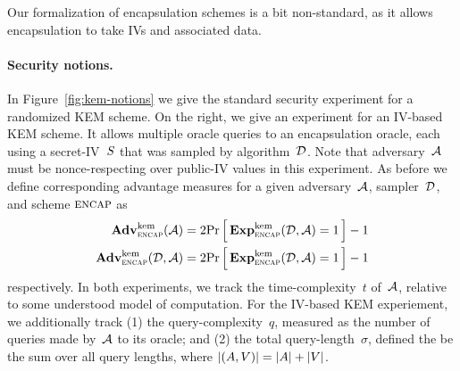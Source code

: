 Our formalization of encapsulation schemes is a bit non-standard, as it allows encapsulation to take IVs and associated data.

\paragraph{Security notions. } In Figure~\ref{fig:kem-notions} we give the standard security experiment for a randomized KEM scheme.  On the right, we give an experiment for an IV-based KEM scheme.  It allows multiple oracle queries to an encapsulation oracle, each using a secret-IV~$S$ that was sampled by algorithm~${\cal D}$.  Note that adversary~${\cal A}$ must be nonce-respecting over public-IV values in this experiment.
As before we define corresponding advantage measures for a given adversary~${\cal A}$, sampler~${\cal D}$, and scheme $\textsc{encap}$ as
\begin{align*}
\mathbf{Adv}^{\mathrm{kem}}_{\textsc{encap}}{({\cal A})}&=2{\Pr\left[\,{\mathbf{Exp}^{\mathrm{kem}}_{\textsc{encap}}{({\cal D},{\cal A})}=1}\,\right]}-1\\ \mathbf{Adv}^{\mathrm{kem}}_{\textsc{encap}}{({\cal D},{\cal A})}&=2{\Pr\left[\,{\mathbf{Exp}^{\mathrm{kem}}_{\textsc{encap}}{({\cal D},{\cal A})}=1}\,\right]}-1
\end{align*}
respectively.  In both experiments, we track the time-complexity~$t$ of~${\cal A}$, relative to some understood model of computation.  For the IV-based KEM experiement, we additionally track (1) the query-complexity~$q$, measured as the number of queries made by~${\cal A}$ to its oracle; and (2) the total query-length~$\sigma$, defined the be the sum over all query lengths, where $|(A,V)|=|A|+|V|$.


